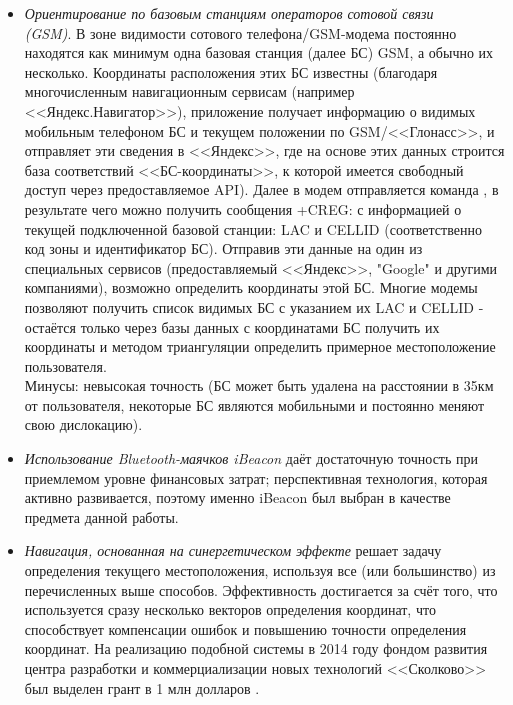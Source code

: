 \begin{itemize}
    \item
    \textit{Ориентирование по базовым станциям операторов сотовой связи \\(GSM)}. В зоне видимости сотового телефона/GSM-модема постоянно находятся как минимум одна базовая станция (далее БС) GSM, а обычно их несколько. Координаты расположения этих БС известны (благодаря многочисленным навигационным сервисам (например <<Яндекс.На\-ви\-га\-тор>>), приложение получает информацию о видимых мобильным телефоном БС и текущем положении по GSM/<<Глонасс>>, и отправляет эти сведения в <<Яндекс>>, где на основе этих данных строится база соответствий <<БС-ко\-ор\-ди\-на\-ты>>, к которой имеется свободный доступ через предоставляемое API). Далее в модем отправляется команда , в результате чего можно получить сообщения +CREG: с информацией о текущей подключенной базовой станции: LAC и CELLID (соответственно код зоны и идентификатор БС). Отправив эти данные на один из специальных сервисов (предоставляемый <<Яндекс>>, "Google" и другими компаниями), возможно определить координаты этой БС. Многие модемы позволяют получить список видимых БС с указанием их LAC и CELLID - остаётся только через базы данных с координатами БС получить их координаты и методом триангуляции определить примерное местоположение пользователя. \\
    Минусы: невысокая точность (БС может быть удалена на расстоянии в 35км от пользователя, некоторые БС являются мобильными и постоянно меняют свою дислокацию).
    \item
    \textit{Использование Bluetooth-маячков iBeacon} даёт достаточную точность при приемлемом уровне финансовых затрат; перспективная технология, которая активно развивается, поэтому именно iBeacon был выбран в качестве предмета данной работы.
    \item
    \textit{Навигация, основанная на синергетическом эффекте} решает задачу определения текущего местоположения, используя все (или большинство) из перечисленных выше способов. Эффективность достигается за счёт того, что используется сразу несколько векторов определения координат, что способствует компенсации ошибок и повышению точности определения координат. На реализацию подобной системы в 2014 году фондом развития центра разработки и коммерциализации новых технологий <<Сколково>> был выделен грант в 1 млн долларов \cite{web:HabrBig}.    
\end{itemize}
